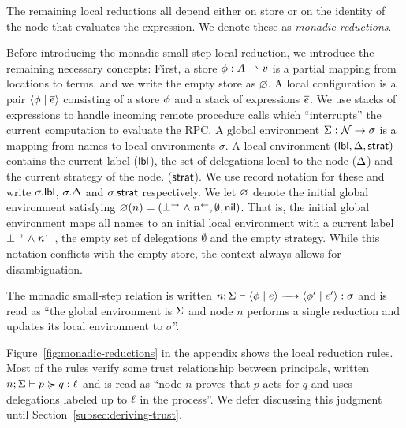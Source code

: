The remaining local reductions all depend either on store or on the identity of the node that evaluates the expression. We denote these as \emph{monadic reductions}.

Before introducing the monadic small-step local reduction, we introduce the remaining necessary concepts: First, a store $\phi: A \rightharpoonup v$ is a partial mapping from locations to terms, and we write the empty store as $\varnothing$. A local configuration is a pair $\langle \phi \mid \overline{e} \rangle$ consisting of a store $\phi$ and a stack of expressions $\overline{e}$. We use stacks of expressions to handle incoming remote procedure calls which ``interrupts'' the current computation to evaluate the RPC. A global environment $\Sigma: \mathcal{N} \to \sigma$ is a mapping from names to local environments $\sigma$. A local environment $(\mathsf{lbl}, \Delta, \mathsf{strat})$ contains the current label ($\mathsf{lbl}$), the set of delegations local to the node ($\Delta$) and the current strategy of the node. ($\mathsf{strat}$). We use record notation for these and write $\sigma.\mathsf{lbl}$, $\sigma.\Delta$ and $\sigma.\mathsf{strat}$ respectively. We let $\varnothing$ denote the initial global environment satisfying $\varnothing(n) = (\bot^{\rightarrow} \mathrel{\land} n^{\leftarrow}, \emptyset, \mathsf{nil})$. That is, the initial global environment maps all names to an initial local environment with a current label $\bot^{\rightarrow} \mathrel{\land} n^{\leftarrow}$, the empty set of delegations $\emptyset$ and the empty strategy. While this notation conflicts with the empty store, the context always allows for disambiguation.

The monadic small-step relation is written $\step{n; \env}{\config{\store}{\expr}}{\config{\store'}{\expr'}}{\sigma}$ and is read as ``the global environment is $\Sigma$ and node $n$ performs a single reduction and updates its local environment to $\sigma$''.

Figure~\ref{fig:monadic-reductions} in the appendix shows the local reduction rules. Most of the rules verify some trust relationship between principals, written $n; \Sigma \vdash p \succcurlyeq q : \ell$ and is read as ``node $n$ proves that $p$ acts for $q$ and uses delegations labeled up to $\ell$ in the process''. We defer discussing this judgment until Section~\ref{subsec:deriving-trust}.

